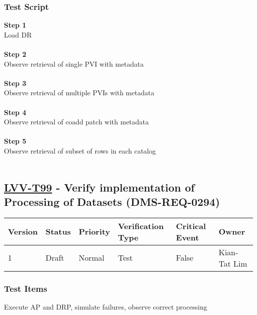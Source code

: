 \hypertarget{test-script-188}{%
\subsubsection{Test Script}\label{test-script-188}}

\textbf{Step 1}\\
Load DR\\
~\\
\textbf{Step 2}\\
Observe retrieval of single PVI with metadata\\
~\\
\textbf{Step 3}\\
Observe retrieval of multiple PVIs with metadata\\
~\\
\textbf{Step 4}\\
Observe retrieval of coadd patch with metadata\\
~\\
\textbf{Step 5}\\
Observe retrieval of subset of rows in each catalog\\
~\\

\hypertarget{lvv-t99---verify-implementation-of-processing-of-datasets-dms-req-0294}{%
\subsection{\texorpdfstring{\href{https://jira.lsstcorp.org/secure/Tests.jspa\#/testCase/LVV-T99}{LVV-T99}
- Verify implementation of Processing of Datasets
(DMS-REQ-0294)}{LVV-T99 - Verify implementation of Processing of Datasets (DMS-REQ-0294)}}\label{lvv-t99---verify-implementation-of-processing-of-datasets-dms-req-0294}}

\begin{longtable}[]{@{}llllll@{}}
\toprule
Version & Status & Priority & Verification Type & Critical Event &
Owner\tabularnewline
\midrule
\endhead
1 & Draft & Normal & Test & False & Kian-Tat Lim\tabularnewline
\bottomrule
\end{longtable}

\hypertarget{test-items-188}{%
\subsubsection{Test Items}\label{test-items-188}}

Execute AP and DRP, simulate failures, observe correct processing

